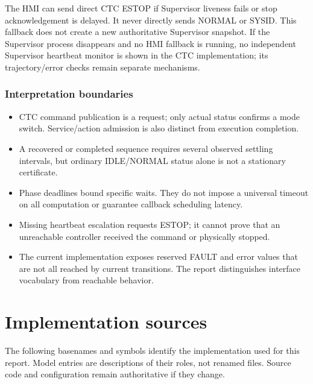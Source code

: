 \documentclass[11pt,a4paper]{report}
\begin{document}
The HMI can send direct CTC ESTOP if Supervisor liveness fails or stop acknowledgement is delayed. It never directly sends NORMAL or SYSID. This fallback does not create a new authoritative Supervisor snapshot. If the Supervisor process disappears and no HMI fallback is running, no independent Supervisor heartbeat monitor is shown in the CTC implementation; its trajectory/error checks remain separate mechanisms.

\subsection{Interpretation boundaries}
\begin{itemize}
\item CTC command publication is a request; only actual status confirms a mode switch. Service/action admission is also distinct from execution completion.
\item A recovered or completed sequence requires several observed settling intervals, but ordinary IDLE/NORMAL status alone is not a stationary certificate.
\item Phase deadlines bound specific waits. They do not impose a universal timeout on all computation or guarantee callback scheduling latency.
\item Missing heartbeat escalation requests ESTOP; it cannot prove that an unreachable controller received the command or physically stopped.
\item The current implementation exposes reserved FAULT and error values that are not all reached by current transitions. The report distinguishes interface vocabulary from reachable behavior.
\end{itemize}


\appendix
\chapter{Implementation sources}
The following basenames and symbols identify the implementation used for
this report. Model entries are descriptions of their roles, not renamed
files. Source code and configuration remain authoritative if they change.
\end{document}
